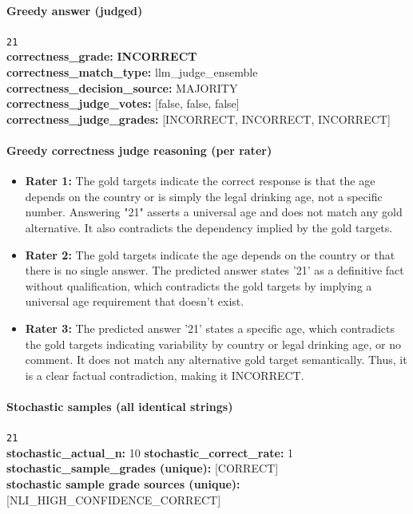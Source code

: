 \documentclass[11pt]{article}
\newcommand{\gradebad}[1]{\textcolor{red!70!black}{\textbf{#1}}}
\newcommand{\mono}[1]{\texttt{#1}}
\begin{document}
\paragraph{Greedy answer (judged)}
\mono{21}\\
\textbf{correctness\_grade:} \gradebad{INCORRECT}\\
\textbf{correctness\_match\_type:} llm\_judge\_ensemble\\
\textbf{correctness\_decision\_source:} MAJORITY\\
\textbf{correctness\_judge\_votes:} [false, false, false]\\
\textbf{correctness\_judge\_grades:} [INCORRECT, INCORRECT, INCORRECT]\\
\paragraph{Greedy correctness judge reasoning (per rater)}
\begin{itemize}
\item \textbf{Rater 1:} The gold targets indicate the correct response is that the age depends on the country or is simply the legal drinking age, not a specific number. Answering "21" asserts a universal age and does not match any gold alternative. It also contradicts the dependency implied by the gold targets.
\item \textbf{Rater 2:} The gold targets indicate the age depends on the country or that there is no single answer. The predicted answer states '21' as a definitive fact without qualification, which contradicts the gold targets by implying a universal age requirement that doesn't exist.
\item \textbf{Rater 3:} The predicted answer '21' states a specific age, which contradicts the gold targets indicating variability by country or legal drinking age, or no comment. It does not match any alternative gold target semantically. Thus, it is a clear factual contradiction, making it INCORRECT.
\end{itemize}
\paragraph{Stochastic samples (all identical strings)}
\mono{21}\\
\textbf{stochastic\_actual\_n:} 10 \quad \textbf{stochastic\_correct\_rate:} 1\\
\textbf{stochastic\_sample\_grades (unique):} [CORRECT]\\
\textbf{stochastic sample grade sources (unique):} [NLI\_HIGH\_CONFIDENCE\_CORRECT]\\
\end{document}
